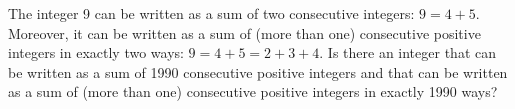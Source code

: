 The integer 9 can be written as a sum of two consecutive integers: $9 = 4 + 5$. Moreover, it can be written as a sum of (more than one) consecutive positive integers in exactly two ways: $9 = 4 + 5 = 2 + 3 + 4$. Is there an integer that can be written as a sum of 1990 consecutive positive integers and that can be written as a sum of (more than one) consecutive positive integers in exactly 1990 ways?
